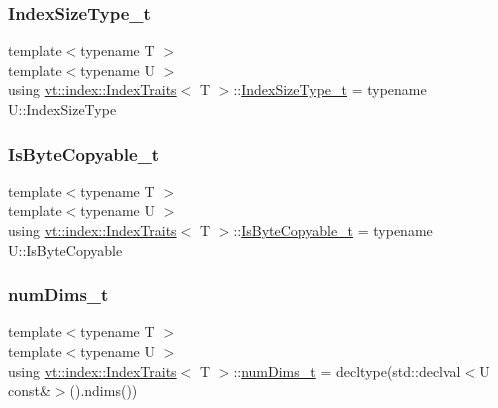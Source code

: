 \mbox{\label{structvt_1_1index_1_1_index_traits_a583a777d70fc52ccfe1083acabc9640f}} 
\subsubsection{\texorpdfstring{Index\+Size\+Type\+\_\+t}{IndexSizeType\_t}}
{\footnotesize\ttfamily template$<$typename T $>$ \\
template$<$typename U $>$ \\
using \hyperlink{structvt_1_1index_1_1_index_traits}{vt\+::index\+::\+Index\+Traits}$<$ T $>$\+::\hyperlink{structvt_1_1index_1_1_index_traits_a583a777d70fc52ccfe1083acabc9640f}{Index\+Size\+Type\+\_\+t} =  typename U\+::\+Index\+Size\+Type}

\mbox{\label{structvt_1_1index_1_1_index_traits_a6869472628098b68d1ce678422814734}} 
\subsubsection{\texorpdfstring{Is\+Byte\+Copyable\+\_\+t}{IsByteCopyable\_t}}
{\footnotesize\ttfamily template$<$typename T $>$ \\
template$<$typename U $>$ \\
using \hyperlink{structvt_1_1index_1_1_index_traits}{vt\+::index\+::\+Index\+Traits}$<$ T $>$\+::\hyperlink{structvt_1_1index_1_1_index_traits_a6869472628098b68d1ce678422814734}{Is\+Byte\+Copyable\+\_\+t} =  typename U\+::\+Is\+Byte\+Copyable}

\mbox{\label{structvt_1_1index_1_1_index_traits_a9c055598424a66789ec9a5986c2ace3a}} 
\subsubsection{\texorpdfstring{num\+Dims\+\_\+t}{numDims\_t}}
{\footnotesize\ttfamily template$<$typename T $>$ \\
template$<$typename U $>$ \\
using \hyperlink{structvt_1_1index_1_1_index_traits}{vt\+::index\+::\+Index\+Traits}$<$ T $>$\+::\hyperlink{structvt_1_1index_1_1_index_traits_a9c055598424a66789ec9a5986c2ace3a}{num\+Dims\+\_\+t} =  decltype(std\+::declval$<$U const\&$>$().ndims())}

